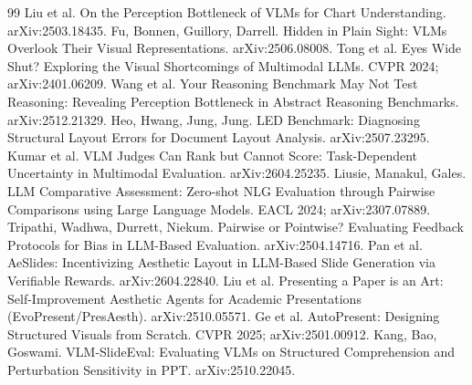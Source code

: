 \documentclass[10pt]{article}
\begin{document}
\begin{thebibliography}{99}\small
 Liu et al. On the Perception Bottleneck of VLMs for Chart Understanding. arXiv:2503.18435.
 Fu, Bonnen, Guillory, Darrell. Hidden in Plain Sight: VLMs Overlook Their Visual Representations. arXiv:2506.08008.
 Tong et al. Eyes Wide Shut? Exploring the Visual Shortcomings of Multimodal LLMs. CVPR 2024; arXiv:2401.06209.
 Wang et al. Your Reasoning Benchmark May Not Test Reasoning: Revealing Perception Bottleneck in Abstract Reasoning Benchmarks. arXiv:2512.21329.
 Heo, Hwang, Jung, Jung. LED Benchmark: Diagnosing Structural Layout Errors for Document Layout Analysis. arXiv:2507.23295.
 Kumar et al. VLM Judges Can Rank but Cannot Score: Task-Dependent Uncertainty in Multimodal Evaluation. arXiv:2604.25235.
 Liusie, Manakul, Gales. LLM Comparative Assessment: Zero-shot NLG Evaluation through Pairwise Comparisons using Large Language Models. EACL 2024; arXiv:2307.07889.
 Tripathi, Wadhwa, Durrett, Niekum. Pairwise or Pointwise? Evaluating Feedback Protocols for Bias in LLM-Based Evaluation. arXiv:2504.14716.
 Pan et al. AeSlides: Incentivizing Aesthetic Layout in LLM-Based Slide Generation via Verifiable Rewards. arXiv:2604.22840.
 Liu et al. Presenting a Paper is an Art: Self-Improvement Aesthetic Agents for Academic Presentations (EvoPresent/PresAesth). arXiv:2510.05571.
 Ge et al. AutoPresent: Designing Structured Visuals from Scratch. CVPR 2025; arXiv:2501.00912.
 Kang, Bao, Goswami. VLM-SlideEval: Evaluating VLMs on Structured Comprehension and Perturbation Sensitivity in PPT. arXiv:2510.22045.

\end{thebibliography}
\end{document}
